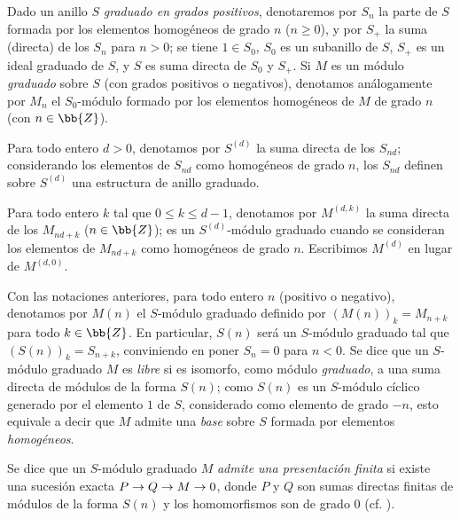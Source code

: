\documentclass[oneside,10pt]{amsart}
\makeatletter
\renewcommand{\leq}{\leqslant}
\renewcommand{\geq}{\geqslant}
\newcommand{\ega@arrow}[2]{\mathchoice{#1}{#2}{#2}{#2}}
\renewcommand{\to}{\ega@arrow{\longrightarrow}{\rightarrow}}
\newcommand{\oldpage}[2][]{\marginnote{\normalfont\footnotesize\textbf{#1}~|~#2}\ignorespaces}
\let\EGAOriginalLabel\label
\renewcommand{\label}[1]{\phantomsection\EGAOriginalLabel{#1}}
\makeatother
\begin{document}
\begin{notation}[2.1.1]
\label{II.2.1.1}
Dado un anillo $S$ \emph{graduado en grados positivos}, denotaremos por $S_n$ la parte de $S$ formada por los elementos homogéneos de grado $n$ ($n\geq0$), y por $S_+$ la suma (directa) de los $S_n$ para $n>0$; se tiene $1\in S_0$, $S_0$ es un subanillo de $S$, $S_+$ es un ideal graduado de $S$, y $S$ es suma directa de $S_0$ y $S_+$.
Si $M$ es un módulo \emph{graduado} sobre $S$ (con grados positivos o negativos), denotamos análogamente por $M_n$ el $S_0$-módulo formado por los elementos homogéneos de $M$ de grado $n$ (con $n\in\bb{Z}$).

Para todo entero $d>0$, denotamos por $S^{(d)}$ la suma directa de los $S_{nd}$; considerando los elementos de $S_{nd}$ como homogéneos de grado $n$, los $S_{nd}$ definen sobre $S^{(d)}$ una estructura de anillo graduado.

Para todo entero $k$ tal que $0\leq k\leq d-1$, denotamos por $M^{(d,k)}$ la suma directa
\oldpage[II]{20}
de los $M_{nd+k}$ ($n\in\bb{Z}$); es un $S^{(d)}$-módulo graduado cuando se consideran los elementos de $M_{nd+k}$ como homogéneos de grado $n$.
Escribimos $M^{(d)}$ en lugar de $M^{(d,0)}$.

Con las notaciones anteriores, para todo entero $n$ (positivo o negativo), denotamos por $M(n)$ el $S$-módulo graduado definido por $(M(n))_k=M_{n+k}$ para todo $k\in\bb{Z}$.
En particular, $S(n)$ será un $S$-módulo graduado tal que $(S(n))_k=S_{n+k}$, conviniendo en poner $S_n=0$ para $n<0$.
Se dice que un $S$-módulo graduado $M$ es \emph{libre} si es isomorfo, como módulo \emph{graduado}, a una suma directa de módulos de la forma $S(n)$; como $S(n)$ es un $S$-módulo cíclico generado por el elemento $1$ de $S$, considerado como elemento de grado $-n$, esto equivale a decir que $M$ admite una \emph{base} sobre $S$ formada por elementos \emph{homogéneos}.

Se dice que un $S$-módulo graduado $M$ \emph{admite una presentación finita} si existe una sucesión exacta $P\to Q\to M\to0$, donde $P$ y $Q$ son sumas directas finitas de módulos de la forma $S(n)$ y los homomorfismos son de grado $0$ (cf. ).
\end{notation}
\end{document}
